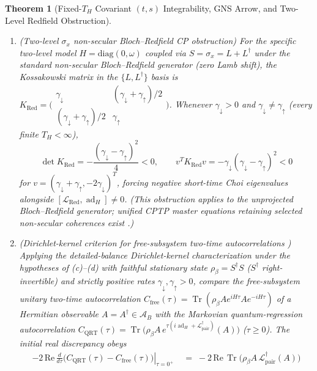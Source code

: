 \documentclass[11pt,a4paper]{article}
\newtheorem{theorem}{Theorem}
\theoremstyle{definition}
\theoremstyle{remark}
\newcommand{\Tr}{\operatorname{Tr}}
\newcommand{\ad}{\operatorname{ad}}
\newcommand{\cA}{\mathcal{A}}
\newcommand{\cL}{\mathcal{L}}
\newcommand{\1}{\mathbf{1}}
\begin{document}
\begin{theorem}[Fixed-$T_H$ Covariant $(t,s)$ Integrability, GNS Arrow, and Two-Level Redfield Obstruction]
\begin{enumerate}
  \item[(e)] \emph{(Two-level $\sigma_x$ non-secular Bloch--Redfield CP obstruction)} For the specific two-level model $H=\mathrm{diag}(0,\omega)$ coupled via $S=\sigma_x=L+L^\dagger$ under the standard non-secular Bloch--Redfield generator (zero Lamb shift), the Kossakowski matrix in the $\{L,L^\dagger\}$ basis is $K_{\mathrm{Red}} = \bigl(\begin{smallmatrix} \gamma_\downarrow & (\gamma_\downarrow+\gamma_\uparrow)/2 \\ (\gamma_\downarrow+\gamma_\uparrow)/2 & \gamma_\uparrow \end{smallmatrix}\bigr)$. Whenever $\gamma_\downarrow > 0$ and $\gamma_\downarrow \neq \gamma_\uparrow$ (every finite $T_H < \infty$),
  \begin{equation}\label{eq:redfield-nogo}
    \det K_{\mathrm{Red}} = -\frac{(\gamma_\downarrow - \gamma_\uparrow)^2}{4} < 0, \qquad
    v^T K_{\mathrm{Red}} v = -\gamma_\downarrow(\gamma_\downarrow - \gamma_\uparrow)^2 < 0
  \end{equation}
  for $v = (\gamma_\downarrow+\gamma_\uparrow,-2\gamma_\downarrow)^T$, forcing negative short-time Choi eigenvalues alongside $[\cL_{\mathrm{Red}},\ad_H]\neq 0$. (This obstruction applies to the unprojected Bloch--Redfield generator; unified CPTP master equations retaining selected non-secular coherences exist \cite{Trushechkin2021}.)
  \item[(f)] \emph{(Dirichlet-kernel criterion for free-subsystem two-time autocorrelations \cite{Evans1977,Frigerio1978})} Applying the detailed-balance Dirichlet-kernel characterization under the hypotheses of (c)--(d) with faithful stationary state $\rho_\beta = S^\dagger S$ ($S^\dagger$ right-invertible) and strictly positive rates $\gamma_\downarrow, \gamma_\uparrow > 0$, compare the \emph{free-subsystem} unitary two-time autocorrelation $C_{\mathrm{free}}(\tau)=\Tr(\rho_\beta A e^{iH\tau}Ae^{-iH\tau})$ of a Hermitian observable $A=A^\dagger\in\cA_B$ with the Markovian quantum-regression autocorrelation $C_{\mathrm{QRT}}(\tau)=\Tr\bigl(\rho_\beta A\,e^{\tau(i\ad_H+\cL_{\mathrm{pair}}^\dagger)}(A)\bigr)$ ($\tau\ge 0$). The initial real discrepancy obeys
  \begin{equation}\label{eq:qrt-nogo}
    \begin{aligned}
      -2\,\mathrm{Re}\,\left.\frac{d}{d\tau}\bigl(C_{\mathrm{QRT}}(\tau)-C_{\mathrm{free}}(\tau)\bigr)\right|_{\tau=0^+}
      &\;=\; -2\,\mathrm{Re}\,\Tr\bigl(\rho_\beta A\,\cL_{\mathrm{pair}}^\dagger(A)\bigr) \\

\end{aligned}
\end{equation}
\end{enumerate}
\end{theorem}
\end{document}
